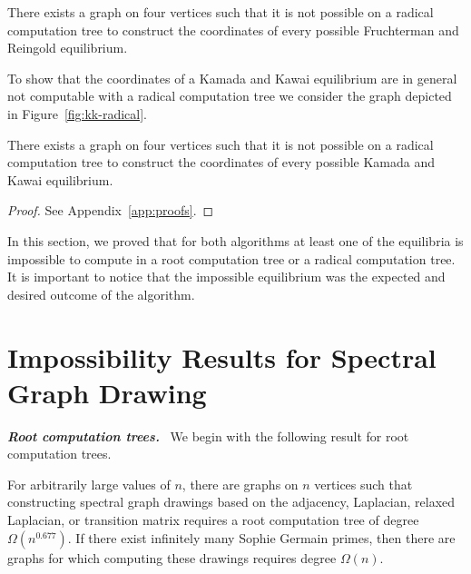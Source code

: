 \documentclass[oribibl,10pt]{llncs}
\newcommand{\Emph}[1]{\smallskip\textbf{\textit{#1}}~}
\begin{document}
\begin{theorem}
There exists a graph on four vertices such that it is not possible on a radical computation tree to construct the coordinates of every possible Fruchterman and Reingold equilibrium.
\end{theorem}

To show that the coordinates of a Kamada and Kawai equilibrium are in general not computable with a radical computation tree we consider the graph depicted in Figure~\ref{fig:kk-radical}.

\begin{theorem}
\label{thm:kk-radical}
There exists a graph on four vertices such that it is not possible on a radical computation tree to construct the coordinates of every possible Kamada and Kawai equilibrium.
\end{theorem}
\begin{proof}
See Appendix~\ref{app:proofs}.
\end{proof}

\ifFull
In this section, we proved that for both algorithms at least one of the equilibria is impossible to compute in a root computation tree or a radical computation tree. 
It is important to notice that the impossible equilibrium was the expected and desired outcome of the algorithm.
\fi

\section{Impossibility Results for Spectral Graph Drawing}
\Emph{Root computation trees.}
We begin with the following result for root computation trees.

\begin{theorem}
For arbitrarily large values of $n$, there are graphs on $n$ vertices such that constructing spectral graph drawings based on the adjacency, Laplacian, relaxed Laplacian, or transition matrix requires a root computation tree of degree $\Omega(n^{0.677})$. If there exist infinitely many Sophie Germain primes, then there are graphs for which computing these drawings requires degree $\Omega(n)$.
\end{theorem}
\end{document}
